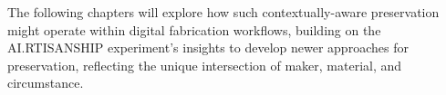 \vspace{0.5cm}

The following chapters will explore how such contextually-aware preservation might operate within digital fabrication workflows, building on the AI.RTISANSHIP experiment's insights to develop newer approaches for preservation, reflecting the unique intersection of maker, material, and circumstance.































































